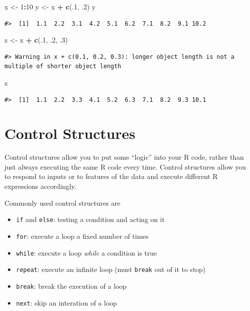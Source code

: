 \documentclass[]{book}
\newenvironment{Shaded}{\begin{snugshade}}{\end{snugshade}}
\newcommand{\KeywordTok}[1]{\textcolor[rgb]{0.13,0.29,0.53}{\textbf{#1}}}
\newcommand{\DecValTok}[1]{\textcolor[rgb]{0.00,0.00,0.81}{#1}}
\newcommand{\StringTok}[1]{\textcolor[rgb]{0.31,0.60,0.02}{#1}}
\newcommand{\OperatorTok}[1]{\textcolor[rgb]{0.81,0.36,0.00}{\textbf{#1}}}
\newcommand{\NormalTok}[1]{#1}
\theoremstyle{definition}
\theoremstyle{definition}
\theoremstyle{definition}
\theoremstyle{remark}
\begin{document}
\begin{Shaded}
\begin{Highlighting}[]
\NormalTok{x <-}\StringTok{ }\DecValTok{1}\OperatorTok{:}\DecValTok{10}
\NormalTok{y <-}\StringTok{ }\NormalTok{x }\OperatorTok{+}\StringTok{ }\KeywordTok{c}\NormalTok{(.}\DecValTok{1}\NormalTok{, .}\DecValTok{2}\NormalTok{) }
\NormalTok{y}
\end{Highlighting}
\end{Shaded}

\begin{verbatim}
#>  [1]  1.1  2.2  3.1  4.2  5.1  6.2  7.1  8.2  9.1 10.2
\end{verbatim}

\begin{Shaded}
\begin{Highlighting}[]
\NormalTok{z <-}\StringTok{ }\NormalTok{x }\OperatorTok{+}\StringTok{ }\KeywordTok{c}\NormalTok{(.}\DecValTok{1}\NormalTok{, .}\DecValTok{2}\NormalTok{, .}\DecValTok{3}\NormalTok{)}
\end{Highlighting}
\end{Shaded}

\begin{verbatim}
#> Warning in x + c(0.1, 0.2, 0.3): longer object length is not a multiple of shorter object length
\end{verbatim}

\begin{Shaded}
\begin{Highlighting}[]
\NormalTok{z}
\end{Highlighting}
\end{Shaded}

\begin{verbatim}
#>  [1]  1.1  2.2  3.3  4.1  5.2  6.3  7.1  8.2  9.3 10.1
\end{verbatim}

\section{Control Structures}\label{control-structures}

Control structures allow you to put some ``logic'' into your R code,
rather than just always executing the same R code every time. Control
structures allow you to respond to inputs or to features of the data and
execute different R expressions accordingly.

Commonly used control structures are

\begin{itemize}
\item
  \texttt{if} and \texttt{else}: testing a condition and acting on it
\item
  \texttt{for}: execute a loop a fixed number of times
\item
  \texttt{while}: execute a loop \emph{while} a condition is true
\item
  \texttt{repeat}: execute an infinite loop (must \texttt{break} out of
  it to stop)
\item
  \texttt{break}: break the execution of a loop
\item
  \texttt{next}: skip an interation of a loop
\end{itemize}
\end{document}
